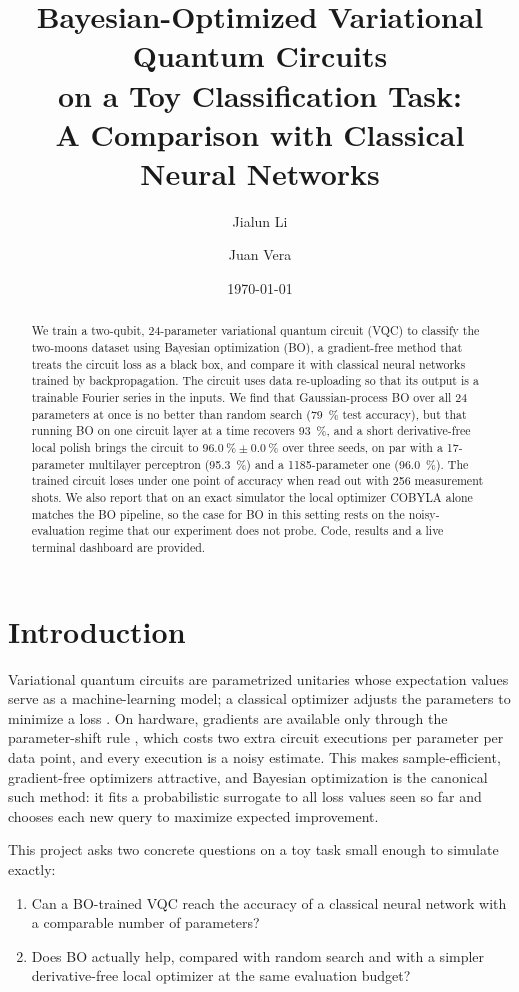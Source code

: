\documentclass[10pt,twocolumn]{article}
\title{\vspace{-1.2em}Bayesian-Optimized Variational Quantum Circuits\\
on a Toy Classification Task:\\
\large A Comparison with Classical Neural Networks}
\author{Jialun Li \and Juan Vera}
\date{\normalsize \today}
\begin{document}
\maketitle

\begin{abstract}
We train a two-qubit, 24-parameter variational quantum circuit (VQC) to classify
the two-moons dataset using Bayesian optimization (BO), a gradient-free method that
treats the circuit loss as a black box, and compare it with classical neural
networks trained by backpropagation. The circuit uses data re-uploading so that its
output is a trainable Fourier series in the inputs. We find that Gaussian-process BO
over all 24 parameters at once is no better than random search (\SI{79}{\percent}
test accuracy), but that running BO on one circuit layer at a time recovers
\SI{93}{\percent}, and a short derivative-free local polish brings the circuit to
$\SI{96.0}{\percent}\pm\SI{0.0}{\percent}$ over three seeds, on par with a
17-parameter multilayer perceptron (\SI{95.3}{\percent}) and a 1185-parameter one
(\SI{96.0}{\percent}). The trained circuit loses under one point of accuracy when
read out with 256 measurement shots. We also report that on an exact simulator the
local optimizer COBYLA alone matches the BO pipeline, so the case for BO in this
setting rests on the noisy-evaluation regime that our experiment does not probe.
Code, results and a live terminal dashboard are provided.
\end{abstract}

\section{Introduction}

Variational quantum circuits are parametrized unitaries whose expectation values
serve as a machine-learning model; a classical optimizer adjusts the parameters to
minimize a loss \citep{cerezo2021vqa}. On hardware, gradients are available only
through the parameter-shift rule \citep{schuld2019gradients}, which costs two extra
circuit executions per parameter per data point, and every execution is a noisy
estimate. This makes sample-efficient, gradient-free optimizers attractive, and
Bayesian optimization \citep{frazier2018bo,shahriari2016bo} is the canonical such
method: it fits a probabilistic surrogate to all loss values seen so far and
chooses each new query to maximize expected improvement.

This project asks two concrete questions on a toy task small enough to simulate
exactly:
\begin{enumerate}\setlength\itemsep{0pt}
  \item Can a BO-trained VQC reach the accuracy of a classical neural network with a
        comparable number of parameters?
  \item Does BO actually help, compared with random search and with a simpler
        derivative-free local optimizer at the same evaluation budget?
\end{enumerate}
\end{document}

